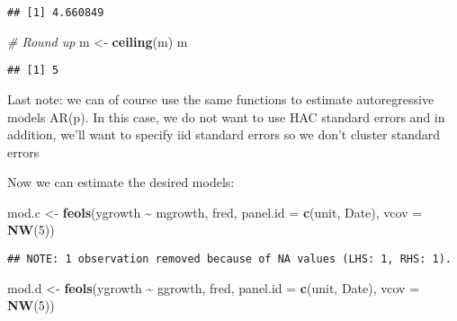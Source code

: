 \documentclass[
]{article}
\newenvironment{Shaded}{\begin{snugshade}}{\end{snugshade}}
\newcommand{\AttributeTok}[1]{\textcolor[rgb]{0.13,0.29,0.53}{#1}}
\newcommand{\CommentTok}[1]{\textcolor[rgb]{0.56,0.35,0.01}{\textit{#1}}}
\newcommand{\DecValTok}[1]{\textcolor[rgb]{0.00,0.00,0.81}{#1}}
\newcommand{\FunctionTok}[1]{\textcolor[rgb]{0.13,0.29,0.53}{\textbf{#1}}}
\newcommand{\NormalTok}[1]{#1}
\newcommand{\OtherTok}[1]{\textcolor[rgb]{0.56,0.35,0.01}{#1}}
\newcommand{\SpecialCharTok}[1]{\textcolor[rgb]{0.81,0.36,0.00}{\textbf{#1}}}
\newcommand{\StringTok}[1]{\textcolor[rgb]{0.31,0.60,0.02}{#1}}
\begin{document}
\begin{verbatim}
## [1] 4.660849
\end{verbatim}

\begin{Shaded}
\begin{Highlighting}[]
\CommentTok{\# Round up}
\NormalTok{m }\OtherTok{\textless{}{-}} \FunctionTok{ceiling}\NormalTok{(m)}
\NormalTok{m}
\end{Highlighting}
\end{Shaded}

\begin{verbatim}
## [1] 5
\end{verbatim}

Last note: we can of course use the same functions to estimate
autoregressive models AR(p). In this case, we do not want to use HAC
standard errors and in addition, we'll want to specify iid standard
errors so we don't cluster standard errors

Now we can estimate the desired models:

\begin{Shaded}
\begin{Highlighting}[]
\NormalTok{mod.c }\OtherTok{\textless{}{-}} \FunctionTok{feols}\NormalTok{(ygrowth }\SpecialCharTok{\textasciitilde{}}\NormalTok{ mgrowth, fred,}
               \AttributeTok{panel.id =} \FunctionTok{c}\NormalTok{(}\StringTok{\textquotesingle{}unit\textquotesingle{}}\NormalTok{, }\StringTok{\textquotesingle{}Date\textquotesingle{}}\NormalTok{),}
               \AttributeTok{vcov =} \FunctionTok{NW}\NormalTok{(}\DecValTok{5}\NormalTok{))}
\end{Highlighting}
\end{Shaded}

\begin{verbatim}
## NOTE: 1 observation removed because of NA values (LHS: 1, RHS: 1).
\end{verbatim}

\begin{Shaded}
\begin{Highlighting}[]
\NormalTok{mod.d }\OtherTok{\textless{}{-}} \FunctionTok{feols}\NormalTok{(ygrowth }\SpecialCharTok{\textasciitilde{}}\NormalTok{ ggrowth, fred,}
               \AttributeTok{panel.id =} \FunctionTok{c}\NormalTok{(}\StringTok{\textquotesingle{}unit\textquotesingle{}}\NormalTok{, }\StringTok{\textquotesingle{}Date\textquotesingle{}}\NormalTok{),}
               \AttributeTok{vcov =} \FunctionTok{NW}\NormalTok{(}\DecValTok{5}\NormalTok{))}
\end{Highlighting}
\end{Shaded}
\end{document}
